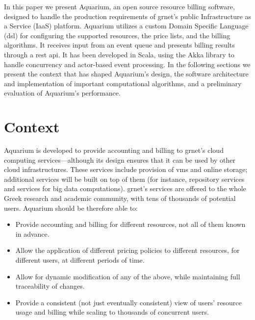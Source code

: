 \documentclass[letterpaper,twocolumn,10pt]{article}
\newcommand{\grnet}{{\sc grnet}\xspace}
\begin{document}
In this paper we present Aquarium, an open source resource billing
software, designed to handle the production requirements of \grnet's
public Infrastructure as a Service (IaaS) platform. Aquarium utilizes
a custom Domain Specific Language ({\sc dsl}) for configuring the
supported resources, the price lists, and the billing algorithms. It
receives input from an event queue and presents billing results
through a {\sc rest api}. It has been developed in Scala, using the
Akka library to handle concurrency and actor-based event processing.
In the following sections we present the context that has shaped
Aquarium's design, the software architecture and implementation of
important computational algorithms, and a preliminary evaluation of
Aquarium's performance.

\section{Context}

Aquarium is developed to provide accounting and billing to \grnet's
cloud computing services---although its design ensures that it can be
used by other cloud infrastructures. These services include provision
of {\sc vm}s and online storage; additional services will be built on
top of them (for instance, repository services and services for big
data computations). \grnet's services are offered to the whole Greek
research and academic community, with tens of thousands of potential
users. Aquarium should be therefore able to:

\begin{itemize}

\item Provide accounting and billing for different resources, not all
  of them known in advance.

\item Allow the application of different pricing policies to different
  resources, for different users, at different periods of time.

\item Allow for dynamic modification of any of the above, while
  maintaining full traceability of changes.

\item Provide a consistent (not just eventually consistent) view of
  users' resource usage and billing while scaling to thousands of
  concurrent users.

\end{itemize}
\end{document}
